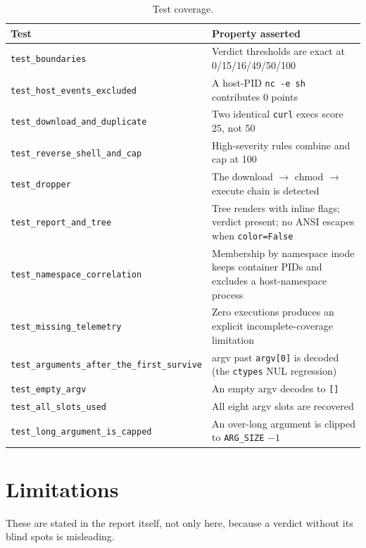 \documentclass[11pt,a4paper]{article}
\newcommand{\code}[1]{\texttt{\small #1}}
\begin{document}
\begin{table}[H]
\centering\footnotesize
\begin{tabular}{@{}lp{86mm}@{}}
\toprule
\textbf{Test} & \textbf{Property asserted} \\
\midrule
\code{test\_boundaries} & Verdict thresholds are exact at 0/15/16/49/50/100 \\
\code{test\_host\_events\_excluded} & A host-PID \code{nc -e sh} contributes 0 points \\
\code{test\_download\_and\_duplicate} & Two identical \code{curl} execs score 25,
  not 50 \\
\code{test\_reverse\_shell\_and\_cap} & High-severity rules combine and cap at 100 \\
\code{test\_dropper} & The download $\rightarrow$ chmod $\rightarrow$ execute chain
  is detected \\
\code{test\_report\_and\_tree} & Tree renders with inline flags; verdict present;
  no ANSI escapes when \code{color=False} \\
\code{test\_namespace\_correlation} & Membership by namespace inode keeps container
  PIDs and excludes a host-namespace process \\
\code{test\_missing\_telemetry} & Zero executions produces an explicit
  incomplete-coverage limitation \\
\code{test\_arguments\_after\_the\_first\_survive} & argv past \code{argv[0]} is
  decoded (the \code{ctypes} NUL regression) \\
\code{test\_empty\_argv} & An empty argv decodes to \code{[]} \\
\code{test\_all\_slots\_used} & All eight argv slots are recovered \\
\code{test\_long\_argument\_is\_capped} & An over-long argument is clipped to
  \code{ARG\_SIZE} $-1$ \\
\bottomrule
\end{tabular}
\caption{Test coverage.}
\end{table}

\section{Limitations}

These are stated in the report itself, not only here, because a verdict without its
blind spots is misleading.
\end{document}
